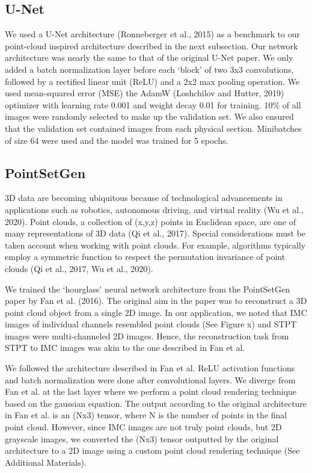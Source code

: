 \documentclass[10pt,twocolumn,letterpaper]{article}
\begin{document}
\subsection{U-Net}

We used a U-Net architecture (Ronneberger et al., 2015) as a benchmark to our point-cloud inspired architecture described in the next subsection. Our network architecture was nearly the same to that of the original U-Net paper. We only added a batch normalization layer before each ‘block’ of two 3x3 convolutions, followed by a rectified linear unit (ReLU) and a 2x2 max pooling operation. We used mean-squared error (MSE) the AdamW (Loshchilov and Hutter, 2019) optimizer with learning rate 0.001 and weight decay 0.01 for training. 10\% of all images were randomly selected to make up the validation set. We also ensured that the validation set contained images from each physical section. Minibatches of size 64 were used and the model was trained for 5 epochs.


\subsection{PointSetGen}

3D data are becoming ubiquitous because of technological advancements in applications such as robotics, autonomous driving, and virtual reality (Wu et al., 2020). Point clouds, a collection of (x,y,z) points in Euclidean space, are one of many representations of 3D data (Qi et al., 2017). Special considerations must be taken account when working with point clouds. For example, algorithms typically employ a symmetric function to respect the permutation invariance of point clouds (Qi et al., 2017, Wu et al., 2020). 

We trained the ‘hourglass’ neural network architecture from the PointSetGen paper by Fan et al. (2016). The original aim in the paper was to reconstruct a 3D point cloud object from a single 2D image. In our application, we noted that IMC images of individual channels resembled point clouds (See Figure x) and STPT images were multi-channeled 2D images. Hence, the reconstruction task from STPT to IMC images was akin to the one described in Fan et al.
 
We followed the architecture described in Fan et al. ReLU activation functions and batch normalization were done after convolutional layers. We diverge from Fan et al. at the last layer where we perform a point cloud rendering technique based on the gaussian equation. The output according to the original architecture in Fan et al. is an (Nx3) tensor, where N is the number of points in the final point cloud. However, since IMC images are not truly point clouds, but 2D grayscale images, we converted the (Nx3) tensor outputted by the original architecture to a 2D image using a custom point cloud rendering technique (See Additional Materials).
\end{document}
